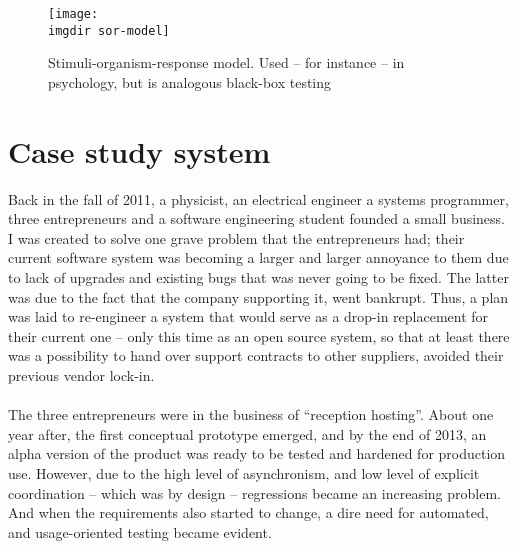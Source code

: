 \begin{figure}[!htbp]
  \centering
  \texttt{[image: \\imgdir sor-model]}
  \label{fig:sor-model}
  \caption{Stimuli-organism-response model. Used -- for instance -- in psychology, but is analogous black-box testing}
\end{figure}

\section{Case study system}
Back in the fall of 2011, a physicist, an electrical engineer a systems programmer, three entrepreneurs and a software engineering student founded a small business. I was created to solve one grave problem that the entrepreneurs had; their current software system was becoming a larger and larger annoyance to them due to lack of upgrades and existing bugs that was never going to be fixed. The latter was due to the fact that the company supporting it, went bankrupt. Thus, a plan was laid to re-engineer a system that would serve as a drop-in replacement for their current one -- only this time as an open source system, so that at least there was a possibility to hand over support contracts to other suppliers, avoided their previous vendor lock-in.\\\\
The three entrepreneurs were in the business of ``reception hosting''. About one year after, the first conceptual prototype emerged, and by the end of 2013, an alpha version of the product was ready to be tested and hardened for production use. However, due to the high level of asynchronism, and low level of explicit coordination -- which was by design -- regressions became an increasing problem. And when the requirements also started to change, a dire need for automated, and usage-oriented testing became evident.


